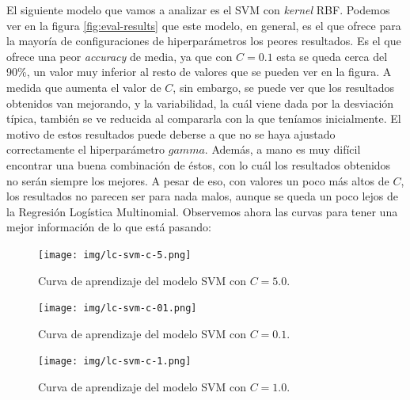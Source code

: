 \documentclass[11pt,a4paper]{article}
\begin{document}
El siguiente modelo que vamos a analizar es el SVM con \textit{kernel} RBF. Podemos ver en la figura \ref{fig:eval-results} que este modelo, en
general, es el que ofrece para la mayoría de configuraciones de hiperparámetros los peores resultados. Es el que
ofrece una peor \textit{accuracy} de media, ya que con $C = 0.1$ esta se queda cerca del 90\%, un valor muy inferior al resto de valores que se
pueden ver en la figura. A medida que aumenta el valor de $C$, sin embargo, se puede ver que los resultados obtenidos van mejorando, y la
variabilidad, la cuál viene dada por la desviación típica, también se ve reducida al compararla con la que teníamos inicialmente. El motivo de estos
resultados puede deberse a que no se haya ajustado correctamente el hiperparámetro $gamma$. Además, a mano es muy difícil encontrar una buena
combinación de éstos, con lo cuál los resultados obtenidos no serán siempre los mejores. A pesar de eso, con valores un poco más altos de $C$, los
resultados no parecen ser para nada malos, aunque se queda un poco lejos de la Regresión Logística Multinomial. Observemos ahora
las curvas para tener una mejor información de lo que está pasando:

\begin{figure}[H]
    \centering
    \texttt{[image: img/lc-svm-c-5.png]}
    \caption{Curva de aprendizaje del modelo SVM con $C=5.0$.}
    \label{fig:lc-svm-c-5}
\end{figure}

\begin{figure}[H]
\centering
\begin{minipage}{.5\textwidth}
    \centering
    \texttt{[image: img/lc-svm-c-01.png]}
    \caption{Curva de aprendizaje del modelo SVM con $C = 0.1$.}
    \label{fig:lc-svm-c-01}
\end{minipage}%
\begin{minipage}{.5\textwidth}
    \centering
    \texttt{[image: img/lc-svm-c-1.png]}
    \caption{Curva de aprendizaje del modelo SVM con $C=1.0$.}
    \label{fig:lc-svm-c-1}
\end{minipage}
\end{figure}
\end{document}
